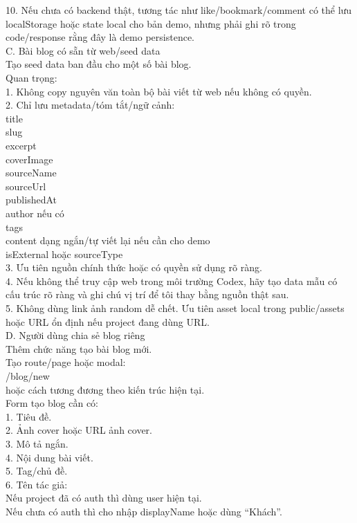 \begin{enumerate}
10. Nếu chưa có backend thật, tương tác như like/bookmark/comment có thể lưu localStorage hoặc state local cho bản demo, nhưng phải ghi rõ trong code/response rằng đây là demo persistence. \\

C. Bài blog có sẵn từ web/seed data \\
Tạo seed data ban đầu cho một số bài blog. \\

Quan trọng: \\

1. Không copy nguyên văn toàn bộ bài viết từ web nếu không có quyền. \\
2. Chỉ lưu metadata/tóm tắt/ngữ cảnh: \\
\* title \\
\* slug \\
\* excerpt \\
\* coverImage \\
\* sourceName \\
\* sourceUrl \\
\* publishedAt \\
\* author nếu có \\
\* tags \\
\* content dạng ngắn/tự viết lại nếu cần cho demo \\
\* isExternal hoặc sourceType \\

3. Ưu tiên nguồn chính thức hoặc có quyền sử dụng rõ ràng. \\
4. Nếu không thể truy cập web trong môi trường Codex, hãy tạo data mẫu có cấu trúc rõ ràng và ghi chú vị trí để tôi thay bằng nguồn thật sau. \\
5. Không dùng link ảnh random dễ chết. Ưu tiên asset local trong public/assets hoặc URL ổn định nếu project đang dùng URL. \\

D. Người dùng chia sẻ blog riêng \\
Thêm chức năng tạo bài blog mới. \\

Tạo route/page hoặc modal: \\
\* /blog/new \\
      hoặc cách tương đương theo kiến trúc hiện tại. \\


Form tạo blog cần có: \\

1. Tiêu đề. \\
2. Ảnh cover hoặc URL ảnh cover. \\
3. Mô tả ngắn. \\
4. Nội dung bài viết. \\
5. Tag/chủ đề. \\
6. Tên tác giả: \\
\* Nếu project đã có auth thì dùng user hiện tại. \\
\* Nếu chưa có auth thì cho nhập displayName hoặc dùng “Khách”. \\


\end{enumerate}
